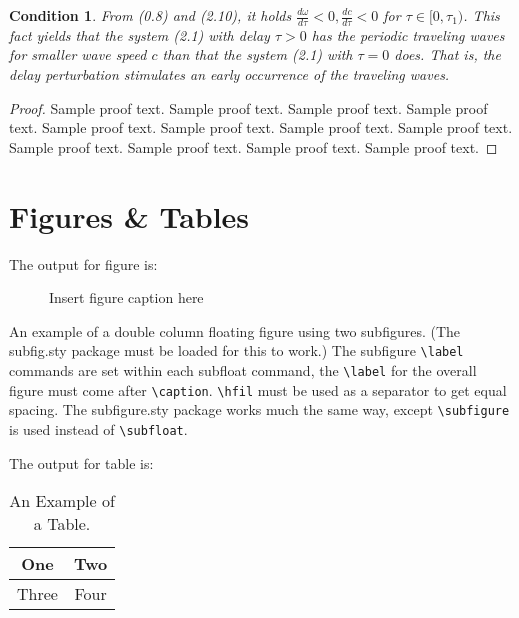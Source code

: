 \documentclass[preprint]{ptephy_v1}%
\newtheorem{condition}{Condition}
\begin{document}
\begin{condition}\label{C2.2}
From (0.8) and (2.10), it holds
$\frac{d\omega}{d\tau}<0,\frac{dc}{d\tau}<0$ for $\tau\in
[0,\tau_1)$. This fact yields that the system (2.1) with delay
$\tau>0$ has the periodic traveling waves for smaller wave speed $c$
than that the system (2.1) with $\tau=0$ does. That is, the
delay perturbation stimulates an early occurrence of the traveling waves.
\end{condition}

\begin{proof}
Sample proof text. Sample proof text. Sample proof text. Sample proof text.
Sample proof text. Sample proof text. Sample proof text. Sample proof text.
Sample proof text. Sample proof text. Sample proof text. Sample proof text.
\end{proof}

\section{Figures \& Tables}

The output for figure is:

\begin{figure}[!h]
\caption{Insert figure caption here}
\label{fig_sim}
\end{figure}

 An example of a double column floating figure using two subfigures.
 (The subfig.sty package must be loaded for this to work.)
 The subfigure \verb+\label+ commands are set within each subfloat command, the
 \verb+\label+ for the overall figure must come after \verb+\caption+.
 \verb+\hfil+ must be used as a separator to get equal spacing.
 The subfigure.sty package works much the same way, except \verb+\subfigure+ is
 used instead of \verb+\subfloat+.


\vskip2pc

\noindent The output for table is:

\begin{table}[!h]
\caption{An Example of a Table.}%
\label{table_example}
\centering
\begin{tabular}{|c||c|}%
\hline
One & Two\\ %
\hline
Three & Four\\%
\hline
\end{tabular}
\end{table}%
\end{document}
